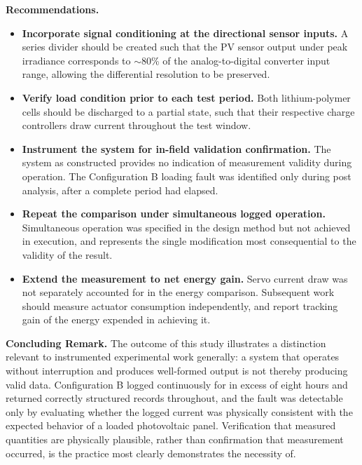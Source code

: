 \documentclass[journal]{IEEEtran}
\begin{document}
\textbf{Recommendations.}

\begin{itemize}
\item \textbf{Incorporate signal conditioning at the directional sensor inputs.} A
series divider should be created such that the PV sensor output under peak irradiance
corresponds to $\sim$80\% of the analog-to-digital converter input range, allowing the
differential resolution to be preserved.
\item \textbf{Verify load condition prior to each test period.} Both lithium-polymer
cells should be discharged to a partial state, such that their respective charge
controllers draw current throughout the test window.
\item \textbf{Instrument the system for in-field validation confirmation.} The system
as constructed provides no indication of measurement validity during operation. The
Configuration B loading fault was identified only during post analysis, after a
complete period had elapsed.
\item \textbf{Repeat the comparison under simultaneous logged operation.} Simultaneous
operation was specified in the design method but not achieved in execution, and
represents the single modification most consequential to the validity of the result.
\item \textbf{Extend the measurement to net energy gain.} Servo current draw was not
separately accounted for in the energy comparison. Subsequent work should measure
actuator consumption independently, and report tracking gain of the energy expended in
achieving it.
\end{itemize}

\textbf{Concluding Remark.} The outcome of this study illustrates a distinction
relevant to instrumented experimental work generally: a system that operates without
interruption and produces well-formed output is not thereby producing valid data.
Configuration B logged continuously for in excess of eight hours and returned
correctly structured records throughout, and the fault was detectable only by
evaluating whether the logged current was physically consistent with the expected
behavior of a loaded photovoltaic panel. Verification that measured quantities are
physically plausible, rather than confirmation that measurement occurred, is the
practice most clearly demonstrates the necessity of.
\end{document}
